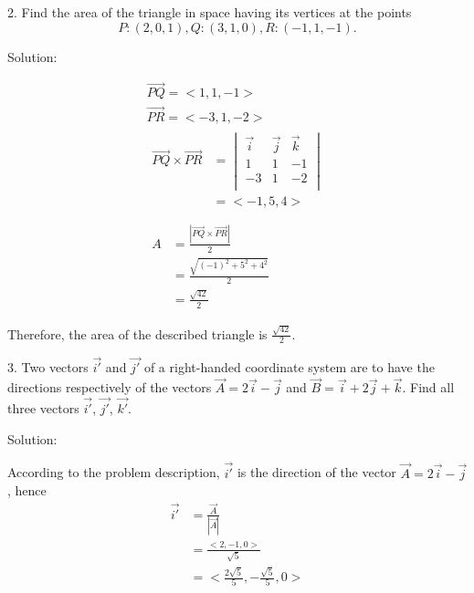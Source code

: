 \documentclass{article}
\begin{document}
2. Find the area of the triangle in space having its vertices at the points
\[ P:(2,0,1), Q:(3,1,0), R:(-1,1,-1).\]

Solution:

\begin{gather*}
  \vec{PQ} = <1, 1, -1> \\
  \vec{PR} = <-3, 1, -2> \\
  \begin{split}
    \vec{PQ} \times \vec{PR} 
    &= \begin{vmatrix}
         \vec{i} & \vec{j} & \vec{k} \\
         1 & 1 & -1 \\
         -3 & 1 & -2 \\
       \end{vmatrix} \\
    &= <-1, 5, 4> \\
  \end{split} \\
  \begin{split}
    A &= \frac{|\vec{PQ} \times \vec{PR}|}{2} \\
      &= \frac{\sqrt{(-1)^2 + 5^2 + 4^2}}{2} \\
      &= \frac{\sqrt{42}}{2} \\
  \end{split} \\
\end{gather*}
Therefore, the area of the described triangle is $\frac{\sqrt{42}}{2}$.

3. Two vectors $\vec{i'}$ and $\vec{j'}$ of a right-handed coordinate system are 
to have the directions respectively of the vectors $\vec{A} = 2\vec{i} - \vec{j}$ 
and $\vec{B} = \vec{i} + 2\vec{j} + \vec{k}$. Find all three vectors
$\vec{i'}$, $\vec{j'}$, $\vec{k'}$.

Solution:

According to the problem description, $\vec{i'}$ is the direction of the vector 
$\vec{A} = 2\vec{i} - \vec{j}$, hence
\begin{equation*}
\begin{split}
  \vec{i'} &= \frac{\vec{A}}{|\vec{A}|} \\
           &= \frac{<2, -1, 0>}{\sqrt{5}} \\
           &= <\frac{2\sqrt{5}}{5}, -\frac{\sqrt{5}}{5}, 0> \\
\end{split}
\end{equation*}
\end{document}
